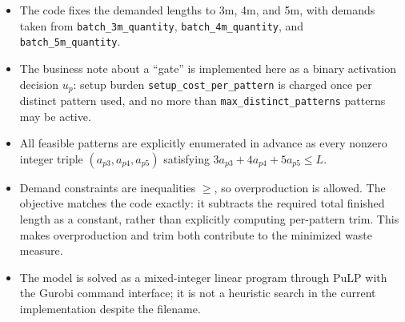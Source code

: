 \begin{itemize}
\item The code fixes the demanded lengths to 3m, 4m, and 5m, with demands taken from \texttt{batch\_3m\_quantity}, \texttt{batch\_4m\_quantity}, and \texttt{batch\_5m\_quantity}.
\item The business note about a ``gate'' is implemented here as a binary activation decision $u_p$: setup burden \texttt{setup\_cost\_per\_pattern} is charged once per distinct pattern used, and no more than \texttt{max\_distinct\_patterns} patterns may be active.
\item All feasible patterns are explicitly enumerated in advance as every nonzero integer triple $(a_{p3},a_{p4},a_{p5})$ satisfying $3a_{p3}+4a_{p4}+5a_{p5}\le L$.
\item Demand constraints are inequalities $\ge$, so overproduction is allowed. The objective matches the code exactly: it subtracts the required total finished length as a constant, rather than explicitly computing per-pattern trim. This makes overproduction and trim both contribute to the minimized waste measure.
\item The model is solved as a mixed-integer linear program through PuLP with the Gurobi command interface; it is not a heuristic search in the current implementation despite the filename.
\end{itemize}
